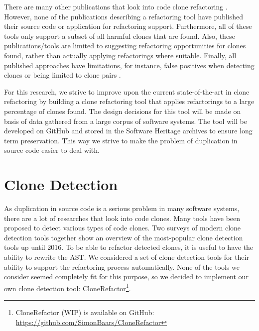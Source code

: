 \documentclass[a4paper]{article}
\begin{document}
There are many other publications that look into code clone refactoring \cite{alwaqfi2017refactoring, chen2018clone, koni2001scenario}. However, none of the publications describing a refactoring tool have published their source code or application for refactoring support. Furthermore, all of these tools only support a subset of all harmful clones that are found. Also, these publications/tools are limited to suggesting refactoring opportunities for clones found, rather than actually applying refactorings where suitable. Finally, all published approaches have limitations, for instance, false positives when detecting clones \cite{chen2018clone} or being limited to clone pairs \cite{higo2008metric}.

For this research, we strive to improve upon the current state-of-the-art in clone refactoring by building a clone refactoring tool that applies refactorings to a large percentage of clones found. The design decisions for this tool will be made on basis of data gathered from a large corpus of software systems. The tool will be developed on GitHub and stored in the Software Heritage \cite{di2017software} archives to ensure long term preservation. This way we strive to make the problem of duplication in source code easier to deal with.

\section{Clone Detection}
As duplication in source code is a serious problem in many software systems, there are a lot of researches that look into code clones. Many tools have been proposed to detect various types of code clones. Two surveys of modern clone detection tools \cite{sheneamer2016survey, svajlenko2014evaluating} together show an overview of the most-popular clone detection tools up until 2016. To be able to refactor detected clones, it is useful to have the ability to rewrite the AST. We considered a set of clone detection tools for their ability to support the refactoring process automatically. None of the tools we consider seemed completely fit for this purpose, so we decided to implement our own clone detection tool: CloneRefactor\footnote{CloneRefactor (WIP) is available on GitHub: \url{https://github.com/SimonBaars/CloneRefactor}}.
\end{document}
